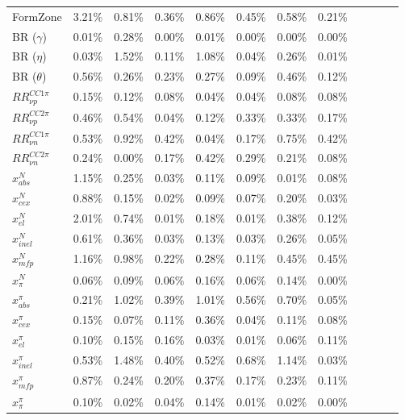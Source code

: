 \documentclass{article}
\begin{document}
\begin{table*}
\begin{tabular}{| l | l | l | l | l | l | l | l | l | l | l | l | }
FormZone  & 3.21\% &  0.81\% &  0.36\% &  0.86\% &  0.45\% &  0.58\% &  0.21\% \\
BR ($\gamma$) & 0.01\% &  0.28\% &  0.00\% &  0.01\% &  0.00\% &  0.00\% &  0.00\% \\
BR ($\eta$) &0.03\% &  1.52\% &  0.11\% &  1.08\% &  0.04\% &  0.26\% &  0.01\% \\
BR ($\theta$) & 0.56\% &  0.26\% &  0.23\% &  0.27\% &  0.09\% &  0.46\% &  0.12\% \\ \hline

$RR_{\nu p}^{CC1\pi}$ & 0.15\% &  0.12\% &  0.08\% &  0.04\% &  0.04\% &  0.08\% &  0.08\% \\ 
$RR_{\nu p}^{CC2\pi}$ & 0.46\% &  0.54\% &  0.04\% &  0.12\% &  0.33\% &  0.33\% &  0.17\% \\
$RR_{\nu n}^{CC1\pi}$ & 0.53\% &  0.92\% &  0.42\% &  0.04\% &  0.17\% &  0.75\% &  0.42\% \\ 
$RR_{\nu n}^{CC2\pi}$ & 0.24\% &  0.00\% &  0.17\% &  0.42\% &  0.29\% &  0.21\% &  0.08\% \\ \hline

$x_{abs}^{N}$ & 1.15\% &  0.25\% &  0.03\% &  0.11\% &  0.09\% &  0.01\% &  0.08\%\\
$x_{cex}^{N}$ & 0.88\% &  0.15\% &  0.02\% &  0.09\% &  0.07\% &  0.20\% &  0.03\% \\
$x_{el}^{N}$ & 2.01\% &  0.74\% &  0.01\% &  0.18\% &  0.01\% &  0.38\% &  0.12\% \\
$x_{inel}^{N}$ & 0.61\% &  0.36\% &  0.03\% &  0.13\% &  0.03\% &  0.26\% &  0.05\% \\
$x_{mfp}^{N}$ & 1.16\% &  0.98\% &  0.22\% &  0.28\% &  0.11\% &  0.45\% &  0.45\% \\
$x_{\pi}^{N}$ & 0.06\% &  0.09\% &  0.06\% &  0.16\% &  0.06\% &  0.14\% &  0.00\%  \\
$x_{abs}^{\pi}$ & 0.21\% &  1.02\% &  0.39\% &  1.01\% &  0.56\% &  0.70\% &  0.05\% \\
$x_{cex}^{\pi}$ & 0.15\% &  0.07\% &  0.11\% &  0.36\% &  0.04\% &  0.11\% &  0.08\% \\
$x_{el}^{\pi}$ &0.10\% &  0.15\% &  0.16\% &  0.03\% &  0.01\% &  0.06\% &  0.11\%\\
$x_{inel}^{\pi}$ & 0.53\% &  1.48\% &  0.40\% &  0.52\% &  0.68\% &  1.14\% &  0.03\%  \\
$x_{mfp}^{\pi}$ & 0.87\% &  0.24\% &  0.20\% &  0.37\% &  0.17\% &  0.23\% &  0.11\% \\
$x_{\pi}^{\pi}$ & 0.10\% &  0.02\% &  0.04\% &  0.14\% &  0.01\% &  0.02\% &  0.00\% \\
\hline
\end{tabular}
\end{table*}
\end{document}
